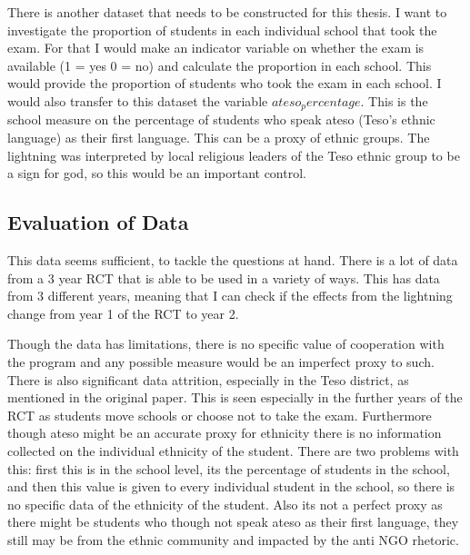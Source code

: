 \documentclass{article}
\begin{document}
There is another dataset that needs to be constructed for this thesis. I want to investigate the proportion of students in each individual school that took the exam. For that I would make an indicator variable on whether the exam is available (1 = yes 0 = no) and calculate the proportion in each school. This would provide the proportion of students who took the exam in each school. I would also transfer to this dataset the variable $ateso_percentage$. This is the school measure on the percentage of students who speak ateso (Teso's ethnic language) as their first language. This can be a proxy of ethnic groups. The lightning was interpreted by local religious leaders of the Teso ethnic group to be a sign for god, so this would be an important control. 

\subsection{Evaluation of Data}

This data seems sufficient, to tackle the questions at hand. There is a lot of data from a 3 year RCT that is able to be used in a variety of ways. This has data from 3 different years, meaning that I can check if the effects from the lightning change from year 1 of the RCT to year 2. 

	Though the data has limitations, there is no specific value of cooperation with the program and any possible measure would be an imperfect proxy to such. There is also significant data attrition, especially in the Teso district, as mentioned in the original paper. This is seen especially in the further years of the RCT as students move schools or choose not to take the exam. Furthermore though ateso might be an accurate proxy for ethnicity there is no information collected on the individual ethnicity of the student. There are two problems with this: first this is in the school level, its the percentage of students in the school, and then this value is given to every individual student in the school, so there is no specific data of the ethnicity of the student. Also its not a perfect proxy as there might be students who though not speak ateso as their first language, they still may be from the ethnic community and impacted by the anti NGO rhetoric. 
	
\end{document}
